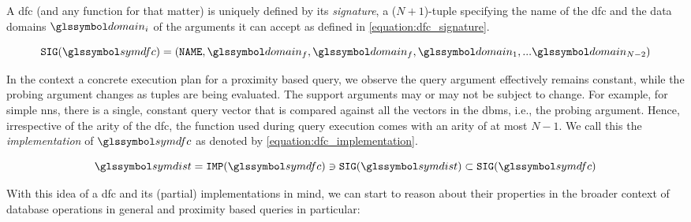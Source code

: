 A \acrshort{dfc} (and any function for that matter) is uniquely defined by its \emph{signature}, a ($N+1$)-tuple specifying the name of the \acrshort{dfc} and the data domains $\domain_i$ of the arguments it can accept as defined in \cref{equation:dfc_signature}.

\begin{equation}
    \label{equation:dfc_signature}
    \texttt{SIG}(\symdfc) = (\mathtt{NAME}, \domain_f, \domain_f, \domain_1,... \domain_{N-2})
\end{equation}

In the context a concrete execution plan for a proximity based query, we observe the query argument effectively remains constant, while the probing argument changes as tuples are being evaluated. The support arguments may or may not be subject to change. For example, for simple \acrshort{nns}, there is a single, constant query vector that is compared against all the vectors in the \acrshort{dbms}, i.e., the probing argument. Hence, irrespective of the arity of the \acrshort{dfc}, the function used during query execution comes with an arity of at most $N-1$. We call this the \emph{implementation} of $\symdfc$ as denoted by \cref{equation:dfc_implementation}.

\begin{equation}
    \label{equation:dfc_implementation}
    \symdist = \texttt{IMP}(\symdfc) \ni \texttt{SIG}(\symdist) \subset \texttt{SIG}(\symdfc)
\end{equation}

With this idea of a \acrshort{dfc} and its (partial) implementations in mind, we can start to reason about their properties in the broader context of database operations in general and proximity based queries in particular:

